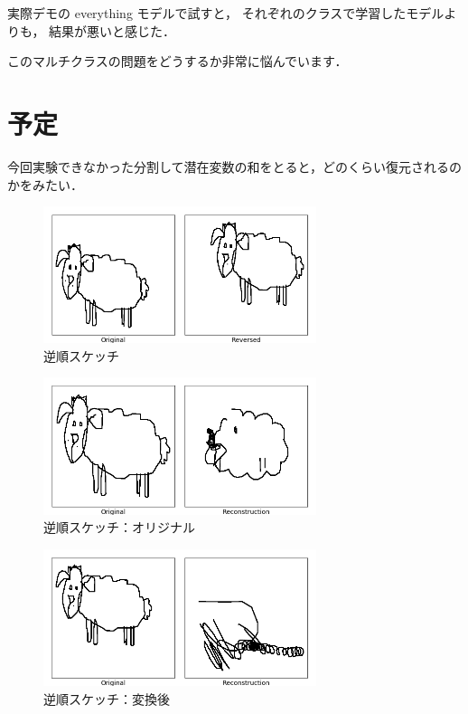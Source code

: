 \documentclass[onecolumn]{ujarticle}   %
\begin{document}
実際デモの everything モデルで試すと，
それぞれのクラスで学習したモデルよりも，
結果が悪いと感じた．

このマルチクラスの問題をどうするか非常に悩んでいます．

\section{予定}
今回実験できなかった分割して潜在変数の和をとると，どのくらい復元されるのかをみたい．


\newpage
\begin{figure}[th]
  \begin{center}
    \includegraphics[clip,width=80mm]{sketch_tra_reverse_0.png}
    \caption{逆順スケッチ}
    \label{fig:result1}
  \end{center}
\end{figure}
\begin{figure}[th]
  \begin{center}
    \includegraphics[clip,width=80mm]{sketch_tra_reverse_org_0.png}
    \caption{逆順スケッチ：オリジナル}
    \label{fig:result1_org}
  \end{center}
\end{figure}
\begin{figure}[th]
  \begin{center}
    \includegraphics[clip,width=80mm]{sketch_tra_reverse_rvr_0.png}
    \caption{逆順スケッチ：変換後}
    \label{fig:result1_rvr}
  \end{center}
\end{figure}
\end{document}
